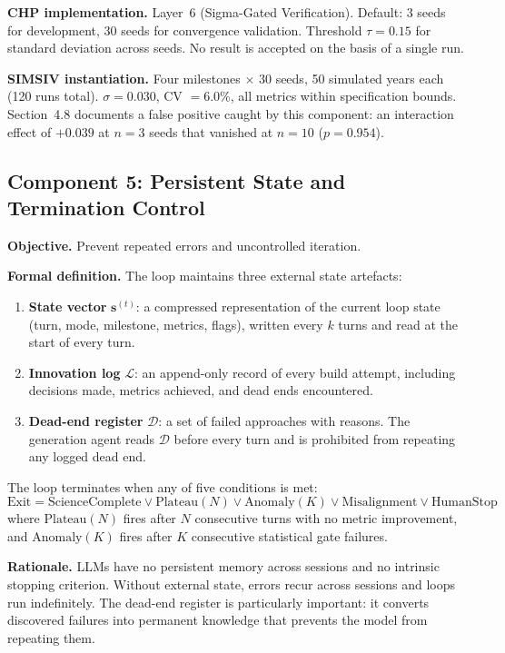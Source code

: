 \documentclass[11pt,a4paper]{article}
\begin{document}
\textbf{CHP implementation.} Layer~6 (Sigma-Gated Verification). Default: 3 seeds for development, 30 seeds for convergence validation. Threshold $\tau = 0.15$ for standard deviation across seeds. No result is accepted on the basis of a single run.

\textbf{SIMSIV instantiation.} Four milestones $\times$ 30 seeds, 50 simulated years each (120 runs total). $\sigma = 0.030$, CV $= 6.0\%$, all metrics within specification bounds. Section~4.8 documents a false positive caught by this component: an interaction effect of $+0.039$ at $n = 3$ seeds that vanished at $n = 10$ ($p = 0.954$).

\subsection{Component 5: Persistent State and Termination Control}

\textbf{Objective.} Prevent repeated errors and uncontrolled iteration.

\textbf{Formal definition.} The loop maintains three external state artefacts:
\begin{enumerate}[leftmargin=*]
\item \textbf{State vector} $\mathbf{s}^{(t)}$: a compressed representation of the current loop state (turn, mode, milestone, metrics, flags), written every $k$ turns and read at the start of every turn.
\item \textbf{Innovation log} $\mathcal{L}$: an append-only record of every build attempt, including decisions made, metrics achieved, and dead ends encountered.
\item \textbf{Dead-end register} $\mathcal{D}$: a set of failed approaches with reasons. The generation agent reads $\mathcal{D}$ before every turn and is prohibited from repeating any logged dead end.
\end{enumerate}

The loop terminates when any of five conditions is met:
\begin{equation}
\text{Exit} = \text{ScienceComplete} \lor \text{Plateau}(N) \lor \text{Anomaly}(K) \lor \text{Misalignment} \lor \text{HumanStop}
\end{equation}
where $\text{Plateau}(N)$ fires after $N$ consecutive turns with no metric improvement, and $\text{Anomaly}(K)$ fires after $K$ consecutive statistical gate failures.

\textbf{Rationale.} LLMs have no persistent memory across sessions and no intrinsic stopping criterion. Without external state, errors recur across sessions and loops run indefinitely. The dead-end register is particularly important: it converts discovered failures into permanent knowledge that prevents the model from repeating them.
\end{document}
